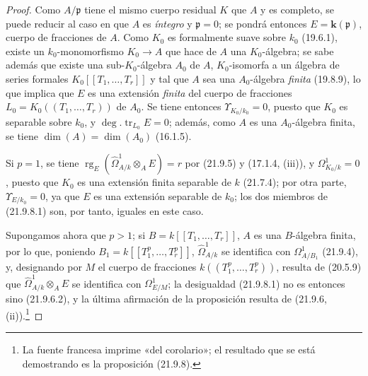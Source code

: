 \begin{proof}
Como $A/\mathfrak p$ tiene el mismo cuerpo residual $K$ que $A$ y es completo,
se puede reducir al caso en que $A$ es \emph{íntegro} y $\mathfrak p=0$; se pondrá
entonces $E=\boldsymbol{k}(\mathfrak p)$, cuerpo de fracciones de $A$. Como $K_0$ es
formalmente suave sobre $k_0$ (19.6.1), existe un $k_0$-monomorfismo
$K_0\to A$ que hace de $A$ una $K_0$-álgebra; se sabe además que existe una
sub-$K_0$-álgebra $A_0$ de $A$, $K_0$-isomorfa a un álgebra de series formales
$K_0[[T_1,\ldots,T_r]]$ y tal que $A$ sea una $A_0$-álgebra \emph{finita}
(19.8.9), lo que implica que $E$ es una extensión \emph{finita} del cuerpo de
fracciones $L_0=K_0((T_1,\ldots,T_r))$ de $A_0$. Se tiene entonces
$\Upsilon_{K_0/k_0}=0$, puesto que $K_0$ es separable sobre $k_0$, y
$\deg.\operatorname{tr}_{L_0}E=0$; además, como $A$ es una $A_0$-álgebra
finita, se tiene $\dim(A)=\dim(A_0)$ (16.1.5).

Si $p=1$, se tiene
$\operatorname{rg}_E(\widehat\Omega^1_{A/k}\otimes_AE)=r$ por (21.9.5) y
(17.1.4, (iii)), y $\Omega^1_{K_0/k}=0$, puesto que $K_0$ es una extensión
finita separable de $k$ (21.7.4); por otra parte,
$\Upsilon_{E/k_0}=0$, ya que $E$ es una extensión separable de $k_0$; los dos
miembros de (21.9.8.1) son, por tanto, iguales en este caso.

Supongamos ahora que $p>1$; si $B=k[[T_1,\ldots,T_r]]$, $A$ es una
$B$-álgebra finita, por lo que, poniendo
$B_1=k[[T_1^p,\ldots,T_r^p]]$, $\widehat\Omega^1_{A/k}$ se identifica con
$\Omega^1_{A/B_1}$ (21.9.4), y, designando por $M$ el cuerpo de fracciones
$k((T_1^p,\ldots,T_r^p))$, resulta de (20.5.9) que
$\widehat\Omega^1_{A/k}\otimes_AE$ se identifica con $\Omega^1_{E/M}$; la
desigualdad (21.9.8.1) no es entonces sino (21.9.6.2), y la última afirmación
de la proposición resulta de (21.9.6, (ii)).\footnote{La fuente francesa
imprime «del corolario»; el resultado que se está demostrando es la
proposición (21.9.8).}
\end{proof}
